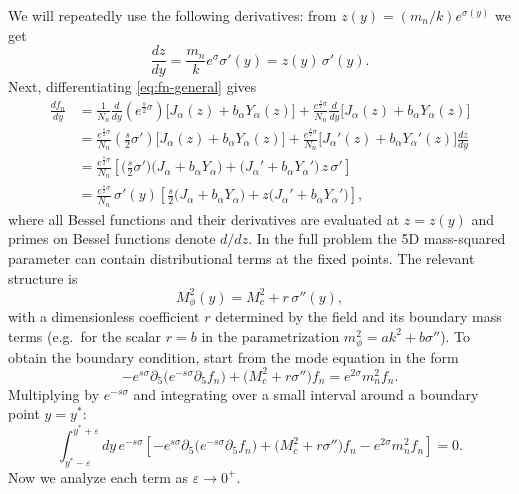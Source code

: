 \documentclass[11pt]{article}
\begin{document}
We will repeatedly use the following derivatives: from $z(y)=(m_n/k)e^{\sigma(y)}$ we get
\begin{equation}
\frac{dz}{dy}=\frac{m_n}{k}e^{\sigma}\sigma'(y)=z(y)\,\sigma'(y).
\label{eq:dzdy}
\end{equation}
Next, differentiating \eqref{eq:fn-general} gives
\begin{align}
\frac{df_n}{dy}
&=\frac{1}{N_n}\frac{d}{dy}\!\left(e^{\frac{s}{2}\sigma}\right)\Big[J_\alpha(z)+b_\alpha Y_\alpha(z)\Big]
+\frac{e^{\frac{s}{2}\sigma}}{N_n}\frac{d}{dy}\Big[J_\alpha(z)+b_\alpha Y_\alpha(z)\Big]
\nonumber\\[4pt]
&=\frac{e^{\frac{s}{2}\sigma}}{N_n}\left(\frac{s}{2}\sigma'\right)\Big[J_\alpha(z)+b_\alpha Y_\alpha(z)\Big]
+\frac{e^{\frac{s}{2}\sigma}}{N_n}\Big[J_\alpha'(z)+b_\alpha Y_\alpha'(z)\Big]\frac{dz}{dy}
\nonumber\\[4pt]
&=\frac{e^{\frac{s}{2}\sigma}}{N_n}\left[
\Big(\frac{s}{2}\sigma'\Big)\Big(J_\alpha+b_\alpha Y_\alpha\Big)
+\Big(J_\alpha'+b_\alpha Y_\alpha'\Big)\,z\,\sigma'
\right]
\nonumber\\[4pt]
&=\frac{e^{\frac{s}{2}\sigma}}{N_n}\,\sigma'(y)\left[
\frac{s}{2}\Big(J_\alpha+b_\alpha Y_\alpha\Big)
+z\Big(J_\alpha'+b_\alpha Y_\alpha'\Big)
\right],
\label{eq:dfdy-general}
\end{align}
where all Bessel functions and their derivatives are evaluated at $z=z(y)$ and primes on Bessel
functions denote $d/dz$. In the full problem the 5D mass-squared parameter can contain distributional terms at the
fixed points. The relevant structure is
\begin{equation}
M_\phi^2(y)=M_c^2 + r\,\sigma''(y),
\label{eq:M-with-sigpp}
\end{equation}
with a dimensionless coefficient $r$ determined by the field and its boundary mass terms
(e.g.\ for the scalar $r=b$ in the parametrization $m_\phi^2=ak^2+b\sigma''$). To obtain the boundary condition, start from the mode equation in the form
\begin{equation}
-e^{s\sigma}\partial_5\!\big(e^{-s\sigma}\partial_5 f_n\big)
+\Big(M_c^2+r\sigma''\Big)f_n
= e^{2\sigma}m_n^2 f_n .
\label{eq:mode-eq-full}
\end{equation}
Multiplying by $e^{-s\sigma}$ and integrating over a small interval around a boundary point $y=y^\ast$:
\begin{equation}
\int_{y^\ast-\varepsilon}^{y^\ast+\varepsilon}\!\!dy\, e^{-s\sigma}
\left[
-e^{s\sigma}\partial_5\!\big(e^{-s\sigma}\partial_5 f_n\big)
+\Big(M_c^2+r\sigma''\Big)f_n
- e^{2\sigma}m_n^2 f_n
\right]=0.
\label{eq:integrate-eq}
\end{equation}
Now we analyze each term as $\varepsilon\to 0^+$.
\end{document}
